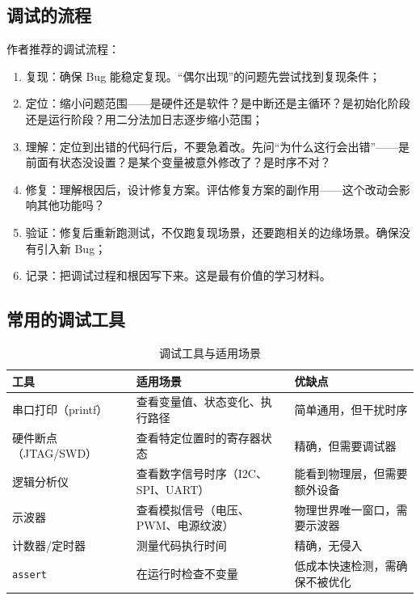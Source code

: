 \subsection{调试的流程}

作者推荐的调试流程：

\begin{enumerate}
	\item 复现：确保 Bug 能稳定复现。“偶尔出现”的问题先尝试找到复现条件；
	\item 定位：缩小问题范围——是硬件还是软件？是中断还是主循环？是初始化阶段还是运行阶段？用二分法加日志逐步缩小范围；
	\item 理解：定位到出错的代码行后，不要急着改。先问“为什么这行会出错”——是前面有状态没设置？是某个变量被意外修改了？是时序不对？
	\item 修复：理解根因后，设计修复方案。评估修复方案的副作用——这个改动会影响其他功能吗？
	\item 验证：修复后重新跑测试，不仅跑复现场景，还要跑相关的边缘场景。确保没有引入新 Bug；
	\item 记录：把调试过程和根因写下来。这是最有价值的学习材料。
\end{enumerate}

\subsection{常用的调试工具}

\begin{table}[htbp]
	\centering
	\caption{调试工具与适用场景}
	\label{tab:app-debug-tools}
	\begin{tabularx}{\textwidth}{lXX}
		\toprule
		工具 & 适用场景 & 优缺点 \\
		\midrule
		串口打印（printf） & 查看变量值、状态变化、执行路径 & 简单通用，但干扰时序 \\
		硬件断点（JTAG/SWD） & 查看特定位置时的寄存器状态 & 精确，但需要调试器 \\
		逻辑分析仪 & 查看数字信号时序（I2C、SPI、UART） & 能看到物理层，但需要额外设备 \\
		示波器 & 查看模拟信号（电压、PWM、电源纹波） & 物理世界唯一窗口，需要示波器 \\
		计数器/定时器 & 测量代码执行时间 & 精确，无侵入 \\
		\texttt{assert} & 在运行时检查不变量 & 低成本快速检测，需确保不被优化 \\
		\bottomrule
	\end{tabularx}
\end{table}

